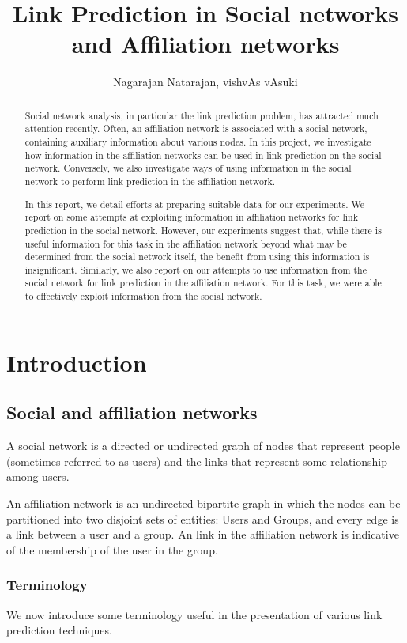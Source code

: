 \documentclass{report}
\title{Link Prediction in Social networks and Affiliation networks}
\author{Nagarajan Natarajan, vishvAs vAsuki}
\date{}
\begin{document}
\maketitle
\tableofcontents

\begin{abstract}
Social network analysis, in particular the link prediction problem, has attracted much attention recently. Often, an affiliation network is associated with a social network, containing auxiliary information about various nodes. In this project, we investigate how information in the affiliation networks can be used in link prediction on the social network. Conversely, we also investigate ways of using information in the social network to perform link prediction in the affiliation network.

In this report, we detail efforts at preparing suitable data for our experiments. We report on some attempts at exploiting information in affiliation networks for link prediction in the social network. However, our experiments suggest that, while there is useful information for this task in the affiliation network beyond what may be determined from the social network itself, the benefit from using this information is insignificant. Similarly, we also report on our attempts to use information from the social network for link prediction in the affiliation network. For this task, we were able to effectively exploit information from the social network.
\end{abstract}


\chapter{Introduction}
\section{Social and affiliation networks}
A social network is a directed or undirected graph of nodes that represent people (sometimes referred to as users) and the links that represent some relationship among users.

An affiliation network is an undirected bipartite graph in which the nodes can be partitioned into two disjoint sets of entities: Users and Groups, and every edge is a link between a user and a group. An link in the affiliation network is indicative of the membership of the user in the group.

\subsection{Terminology}
We now introduce some terminology useful in the presentation of various link prediction techniques.
\end{document}
